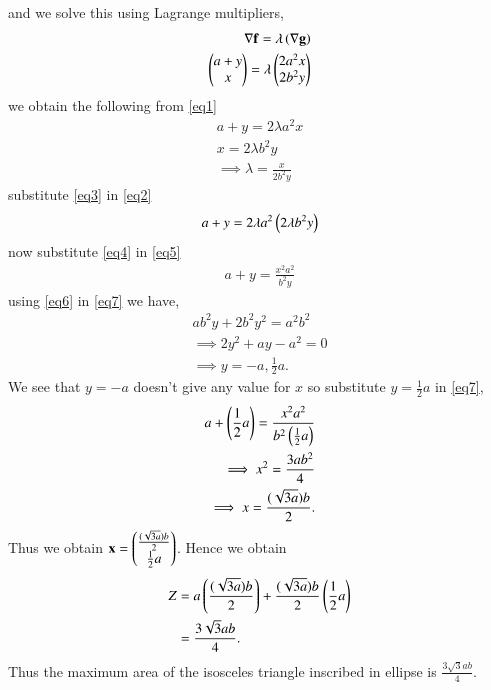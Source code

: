 \documentclass[journal,12pt,twocolumn]{IEEEtran}
\begin{document}
and we solve this using Lagrange multipliers,
\begin{align}
    \nabla \mathbf{f} = \lambda\left(\nabla \mathbf{g}\right) \\ 
    \begin{pmatrix}a+y \\ x\end{pmatrix} = \lambda \begin{pmatrix}2a^2x \\ 2b^2y\end{pmatrix} \label{eq1}
\end{align}
we obtain the following from \eqref{eq1}
\begin{align}
    a+y=2\lambda a^2x \label{eq2} \\ 
    x= 2\lambda b^2y \label{eq3} \\
    \implies \lambda = \frac{x}{2b^2y} \label{eq4}
\end{align}
substitute \eqref{eq3} in \eqref{eq2}
\begin{align}
    a+y = 2\lambda a^2\left(2\lambda b^2y\right) \label{eq5}
\end{align}    
now substitute \eqref{eq4} in \eqref{eq5}
\begin{align}
    a+y = \frac{x^2a^2}{b^2y} \label{eq7}
\end{align}
using \eqref{eq6} in \eqref{eq7} we have,
\begin{align}
  ab^2y+2b^2y^2=a^2b^2 \\
  \implies 2y^2+ay-a^2=0 \\
  \implies y = -a ,\frac{1}{2}a.
\end{align}
We see that $y=-a$ doesn't give any value for $x$ so substitute $y=\frac{1}{2}a$ in \eqref{eq7},
\begin{align}
    a+\left(\frac{1}{2}a\right) = \frac{x^2a^2}{b^2\left(\frac{1}{2}a\right)}
    \\ \implies x^2 = \frac{3ab^2}{4} \\
    \implies x= \frac{(\sqrt{3a})b}{2}.
\end{align}
Thus we obtain $\mathbf{x} = \begin{pmatrix}\frac{(\sqrt{3a})b}{2} \\ \frac{1}{2}a\end{pmatrix}$. Hence we obtain
\begin{equation}
\begin{aligned}
    Z &= a\left(\frac{(\sqrt{3a})b}{2}\right) + \frac{(\sqrt{3a})b}{2} \left(\frac{1}{2}a\right) \\
    &= \frac{3\sqrt{3}ab}{4}.
\end{aligned}
\end{equation}
Thus the maximum area of the isosceles triangle inscribed in ellipse is $\frac{3\sqrt{3}ab}{4}.$
\end{document}
